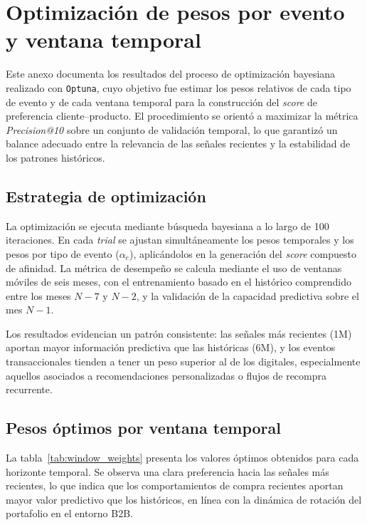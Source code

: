 \chapter{Optimización de pesos por evento y ventana temporal}
\label{AnexoOptuna}

Este anexo documenta los resultados del proceso de optimización bayesiana realizado con \texttt{Optuna}, cuyo objetivo fue estimar los pesos relativos de cada tipo de evento y de cada ventana temporal para la construcción del \textit{score} de preferencia cliente–producto.  
El procedimiento se orientó a maximizar la métrica \textit{Precision@10} sobre un conjunto de validación temporal, lo que garantizó un balance adecuado entre la relevancia de las señales recientes y la estabilidad de los patrones históricos.

\section{Estrategia de optimización}

La optimización se ejecuta mediante búsqueda bayesiana a lo largo de 100 iteraciones.  
En cada \textit{trial} se ajustan simultáneamente los pesos temporales y los pesos por tipo de evento ($\alpha_{e}$), aplicándolos en la generación del \textit{score} compuesto de afinidad.  
La métrica de desempeño se calcula mediante el uso de ventanas móviles de seis meses, con el entrenamiento basado en el histórico comprendido entre los meses $N-7$ y $N-2$, y la validación de la capacidad predictiva sobre el mes $N-1$.

Los resultados evidencian un patrón consistente: las señales más recientes (1M) aportan mayor información predictiva que las históricas (6M), y los eventos transaccionales tienden a tener un peso superior al de los digitales, especialmente aquellos asociados a recomendaciones personalizadas o flujos de recompra recurrente.

\section{Pesos óptimos por ventana temporal}

La tabla~\ref{tab:window_weights} presenta los valores óptimos obtenidos para cada horizonte temporal.  
Se observa una clara preferencia hacia las señales más recientes, lo que indica que los comportamientos de compra recientes aportan mayor valor predictivo que los históricos, en línea con la dinámica de rotación del portafolio en el entorno B2B.

